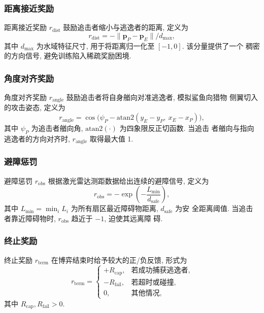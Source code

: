 \subsubsection{距离接近奖励}
距离接近奖励 $r_{\mathrm{dist}}$ 鼓励追击者缩小与逃逸者的距离, 定义为
\begin{equation}
r_{\mathrm{dist}} = -\|\mathbf{p}_P - \mathbf{p}_E\| / d_{\max},
\end{equation}
其中 $d_{\max}$ 为水域特征尺寸, 用于将距离归一化至 $[-1, 0]$. 该分量提供了一个
稠密的方向信号, 避免训练陷入稀疏奖励困境.

\subsubsection{角度对齐奖励}
角度对齐奖励 $r_{\mathrm{angle}}$ 鼓励追击者将自身艏向对准逃逸者, 模拟鲨鱼向猎物
侧翼切入的攻击姿态, 定义为
\begin{equation}
r_{\mathrm{angle}} = \cos\Big(\psi_P - \mathrm{atan2}(y_E - y_P,\ x_E - x_P)\Big),
\end{equation}
其中 $\psi_P$ 为追击者艏向角, $\mathrm{atan2}(\cdot)$ 为四象限反正切函数. 当追击
者艏向与指向逃逸者的方向对齐时, $r_{\mathrm{angle}}$ 取得最大值 1.

\subsubsection{避障惩罚}
避障惩罚 $r_{\mathrm{obs}}$ 根据激光雷达测距数据给出连续的避障信号, 定义为
\begin{equation}
r_{\mathrm{obs}} = -\exp\!\left(-\frac{L_{\min}}{d_{\mathrm{safe}}}\right),
\end{equation}
其中 $L_{\min} = \min_i L_i$ 为所有扇区最近障碍物距离, $d_{\mathrm{safe}}$ 为安
全距离阈值. 当追击者靠近障碍物时, $r_{\mathrm{obs}}$ 趋近于 $-1$, 迫使其远离障
碍.

\subsubsection{终止奖励}
终止奖励 $r_{\mathrm{term}}$ 在博弈结束时给予较大的正/负反馈, 形式为
\begin{equation}
r_{\mathrm{term}} = \begin{cases}
+R_{\mathrm{cap}}, & \text{若成功捕获逃逸者}, \\
-R_{\mathrm{fail}}, & \text{若超时或碰撞}, \\
0, & \text{其他情况},
\end{cases}
\end{equation}
其中 $R_{\mathrm{cap}}, R_{\mathrm{fail}} > 0$.

